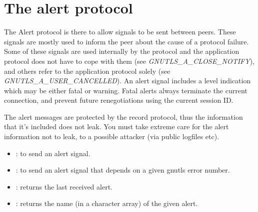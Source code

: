 \section{The alert protocol}

The Alert protocol is there to allow signals to be sent between peers.
These signals are mostly used to inform the peer about the cause of
a protocol failure. Some of these signals are used internally by the
protocol and the application protocol does not have to cope with them
(see \emph{GNUTLS\_A\_CLOSE\_NOTIFY}), and others refer to the
application protocol solely (see \emph{GNUTLS\_A\_USER\_CANCELLED}).
An alert signal includes a level indication which may be either
fatal or warning. Fatal alerts always terminate the current connection,
and prevent future renegotiations using the current session ID.

\par The alert messages are protected by the record protocol, thus
the information that it's included does not leak. You must take
extreme care for the alert information not to leak, to a possible attacker
(via public logfiles etc).

\par
\begin{itemize}
\item {}:
to send an alert signal.
\item {}:
to send an alert signal that depends on a given gnutls error number.
\item {}:
returns the last received alert.
\item {}:
returns the name (in a character array) of the given alert.
\end{itemize}

